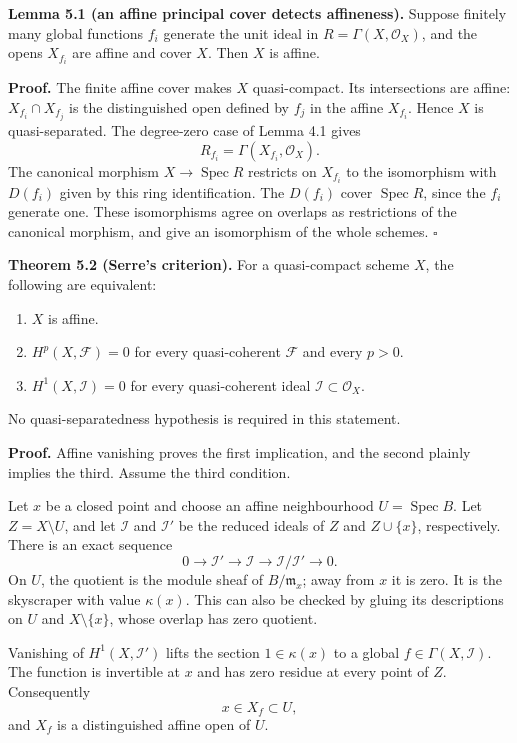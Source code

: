 \documentclass[11pt]{article}
\providecommand{\tightlist}{\setlength{\itemsep}{0pt}\setlength{\parskip}{0pt}}
\begin{document}
\textbf{Lemma 5.1 (an affine principal cover detects affineness).}
Suppose finitely many global functions \(f_i\) generate the unit ideal
in \(R=\Gamma(X,\mathcal O_X)\), and the opens \(X_{f_i}\) are affine
and cover \(X\). Then \(X\) is affine.

\textbf{Proof.} The finite affine cover makes \(X\) quasi-compact. Its
intersections are affine: \(X_{f_i}\cap X_{f_j}\) is the distinguished
open defined by \(f_j\) in the affine \(X_{f_i}\). Hence \(X\) is
quasi-separated. The degree-zero case of Lemma 4.1 gives \[
R_{f_i}=\Gamma(X_{f_i},\mathcal O_X).
\] The canonical morphism \(X\to\operatorname{Spec}R\) restricts on
\(X_{f_i}\) to the isomorphism with \(D(f_i)\) given by this ring
identification. The \(D(f_i)\) cover \(\operatorname{Spec}R\), since the
\(f_i\) generate one. These isomorphisms agree on overlaps as
restrictions of the canonical morphism, and give an isomorphism of the
whole schemes. \(\square\)

\textbf{Theorem 5.2 (Serre's criterion).} For a quasi-compact scheme
\(X\), the following are equivalent:

\begin{enumerate}
\def\labelenumi{\arabic{enumi}.}
\tightlist
\item
  \(X\) is affine.
\item
  \(H^p(X,\mathcal F)=0\) for every quasi-coherent \(\mathcal F\) and
  every \(p>0\).
\item
  \(H^1(X,\mathcal I)=0\) for every quasi-coherent ideal
  \(\mathcal I\subset\mathcal O_X\).
\end{enumerate}

No quasi-separatedness hypothesis is required in this statement.

\textbf{Proof.} Affine vanishing proves the first implication, and the
second plainly implies the third. Assume the third condition.

Let \(x\) be a closed point and choose an affine neighbourhood
\(U=\operatorname{Spec}B\). Let \(Z=X\setminus U\), and let
\(\mathcal I\) and \(\mathcal I'\) be the reduced ideals of \(Z\) and
\(Z\cup\{x\}\), respectively. There is an exact sequence \[
0\to\mathcal I'\to\mathcal I\to\mathcal I/\mathcal I'\to0.
\] On \(U\), the quotient is the module sheaf of \(B/\mathfrak m_x\);
away from \(x\) it is zero. It is the skyscraper with value
\(\kappa(x)\). This can also be checked by gluing its descriptions on
\(U\) and \(X\setminus\{x\}\), whose overlap has zero quotient.

Vanishing of \(H^1(X,\mathcal I')\) lifts the section \(1\in\kappa(x)\)
to a global \(f\in\Gamma(X,\mathcal I)\). The function is invertible at
\(x\) and has zero residue at every point of \(Z\). Consequently \[
x\in X_f\subset U,
\] and \(X_f\) is a distinguished affine open of \(U\).
\end{document}
